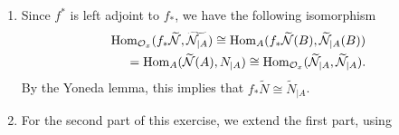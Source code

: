 \newcommand{\sheet}{7}




\maketitle{}

\begin{exercise}{1}
    \begin{enumerate}
        \item Since $f^*$ is left adjoint to $f_*$, we have the following isomorphism
        \begin{align*}
            \operatorname{Hom}_{\mathcal{O}_x}(f_*\widetilde{\mathcal{N}},\widetilde{\mathcal{N}_{|A}})\cong \operatorname{Hom}_A (f_*\widetilde{\mathcal{N}}(B),\widetilde{\mathcal{N}}_{|A}(B))\\
            =\operatorname{Hom}_A(\widetilde{\mathcal{N}}(A),N_{|A})\cong \operatorname{Hom}_{\mathcal{O}_x}(\widetilde{\mathcal{N}}_{|A},\widetilde{\mathcal{N}}_{|A}).
        \end{align*}
        By the Yoneda lemma, this implies that $f_*\widetilde{N}\cong \tilde{N}_{|A}$.
        \item For the second part of this exercise, we extend the first part, using 
    \end{enumerate}
\end{exercise}


